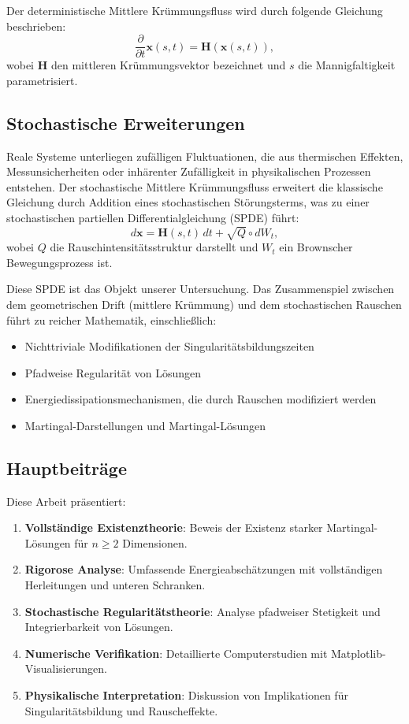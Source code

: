 \documentclass[a4paper,12pt]{article}
\theoremstyle{definition}
\begin{document}
Der deterministische Mittlere Krümmungsfluss wird durch folgende Gleichung beschrieben:
\[
\frac{\partial}{\partial t} \mathbf{x}(s,t) = \mathbf{H}(\mathbf{x}(s,t)),
\]
wobei $\mathbf{H}$ den mittleren Krümmungsvektor bezeichnet und $s$ die Mannigfaltigkeit parametrisiert.

\subsection{Stochastische Erweiterungen}

Reale Systeme unterliegen zufälligen Fluktuationen, die aus thermischen Effekten, Messunsicherheiten oder inhärenter Zufälligkeit in physikalischen Prozessen entstehen. Der stochastische Mittlere Krümmungsfluss erweitert die klassische Gleichung durch Addition eines stochastischen Störungsterms, was zu einer stochastischen partiellen Differentialgleichung (SPDE) führt:
\[
d\mathbf{x} = \mathbf{H}(s,t) \, dt + \sqrt{Q} \circ dW_t,
\]
wobei $Q$ die Rauschintensitätsstruktur darstellt und $W_t$ ein Brownscher Bewegungsprozess ist.

Diese SPDE ist das Objekt unserer Untersuchung. Das Zusammenspiel zwischen dem geometrischen Drift (mittlere Krümmung) und dem stochastischen Rauschen führt zu reicher Mathematik, einschließlich:
\begin{itemize}
	\item Nichttriviale Modifikationen der Singularitätsbildungszeiten
	\item Pfadweise Regularität von Lösungen
	\item Energiedissipationsmechanismen, die durch Rauschen modifiziert werden
	\item Martingal-Darstellungen und Martingal-Lösungen
\end{itemize}

\subsection{Hauptbeiträge}

Diese Arbeit präsentiert:

\begin{enumerate}
	\item \textbf{Vollständige Existenztheorie}: Beweis der Existenz starker Martingal-Lösungen für $n \geq 2$ Dimensionen.
	\item \textbf{Rigorose Analyse}: Umfassende Energieabschätzungen mit vollständigen Herleitungen und unteren Schranken.
	\item \textbf{Stochastische Regularitätstheorie}: Analyse pfadweiser Stetigkeit und Integrierbarkeit von Lösungen.
	\item \textbf{Numerische Verifikation}: Detaillierte Computerstudien mit Matplotlib-Visualisierungen.
	\item \textbf{Physikalische Interpretation}: Diskussion von Implikationen für Singularitätsbildung und Rauscheffekte.
\end{enumerate}
\end{document}
